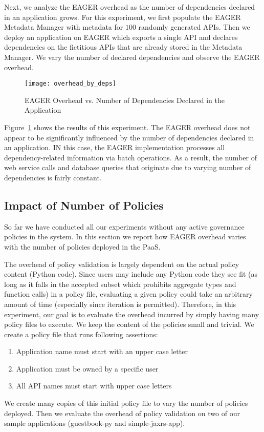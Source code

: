 Next, we analyze the EAGER overhead as the number of dependencies declared in
an application grows. For this experiment, we first populate the EAGER
Metadata Manager with metadata for $100$ randomly generated APIs. Then we
deploy an application on EAGER which exports a single API and declares
dependencies on the fictitious 
APIs that are already stored in the Metadata Manager. We
vary the number of declared dependencies and observe the EAGER overhead.

\begin{figure}
\centering
\texttt{[image: overhead\_by\_deps]}
\caption{EAGER Overhead vs. Number of Dependencies Declared in the Application}
\label{fig:overhead_by_deps}
\end{figure}

Figure~\ref{fig:overhead_by_deps} shows the results of this experiment. 
The EAGER overhead does not appear to be significantly
influenced by the number of dependencies declared in an application. 
IN this case, the EAGER implementation processes
all dependency-related information via batch operations. 
As a result, the number of web service calls and database queries that originate due to varying number of dependencies
is fairly constant. 

\subsection{Impact of Number of Policies}

So far we have conducted all our experiments without any active governance policies in the system. In this section we report how EAGER overhead
varies with the number of policies deployed in the PaaS. 

The overhead of policy validation is largely dependent on the actual policy
content (Python code). Since users may include any Python code they see fit
(as long as it falls in the accepted subset which prohibits aggregate
types and function calls) in a policy file, evaluating a
given policy could take an arbitrary amount of time (especially since
iteration is permitted). Therefore, in this
experiment, our goal is to evaluate the overhead incurred by simply having
many policy files to execute. We keep the content of the policies small and
trivial. We create a policy file that runs following assertions:
\begin{enumerate} 
\item Application name must start with an upper case letter
\item Application must be owned by a specific user 
\item All API names must start with upper case letters 
\end{enumerate} We create many copies of this
initial policy file to vary the number of policies deployed. Then we evaluate
the overhead of policy validation on two of our sample applications
(guestbook-py and simple-jaxrs-app). 

